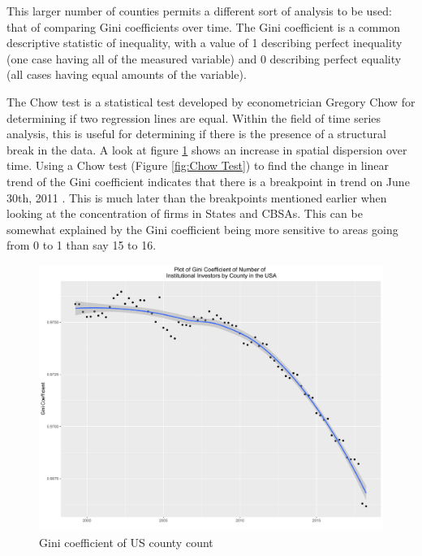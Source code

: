 This larger number of counties permits a different sort of analysis to be used: that of comparing Gini coefficients over time.  The Gini coefficient is a common descriptive statistic of inequality, with a value of 1 describing perfect inequality (one case having all of the measured variable) and 0 describing perfect equality (all cases having equal amounts of the variable). 

The Chow test is a statistical test developed by econometrician Gregory Chow for determining if two regression lines are equal.  Within the field of time series analysis, this is useful for determining if there is the presence of a structural break in the data.  	A look at figure \ref{fig:ginicounty} shows an increase in spatial dispersion over time.  Using a Chow test  (Figure \ref{fig:Chow Test}) to find the change in linear trend of the Gini coefficient indicates that there is a breakpoint in trend on June 30th, 2011  \citep{Chow1960}.  This is much later than the breakpoints mentioned earlier when looking at the concentration of firms in States and CBSAs. 	This can be somewhat explained by the Gini coefficient being more sensitive to areas going from 0 to 1 than say 15 to 16.  




\begin{figure}[h]
	\centering
	\includegraphics[width=1\textwidth]{Figures/ChapterIII/GINI_County}
	\caption[Gini Coefficient of US County Count]{Gini coefficient of US county count}
	\label{fig:ginicounty}
\end{figure}


